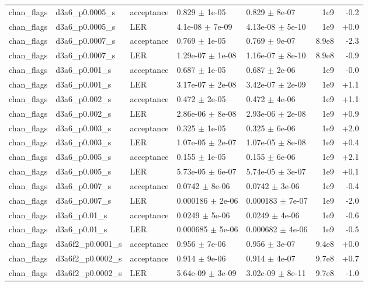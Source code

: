 \documentclass[10pt]{article}
\begin{document}
{\begin{longtable}{l l l l l r r}
chan\_flags & d3a6\_p0.0005\_s & acceptance & 0.829 $\pm$ 1e-05 & 0.829 $\pm$ 8e-07 & 1e9 & -0.2 \\
chan\_flags & d3a6\_p0.0005\_s & LER & 4.1e-08 $\pm$ 7e-09 & 4.13e-08 $\pm$ 5e-10 & 1e9 & +0.0 \\
chan\_flags & d3a6\_p0.0007\_s & acceptance & 0.769 $\pm$ 1e-05 & 0.769 $\pm$ 9e-07 & 8.9e8 & -2.3 \\
chan\_flags & d3a6\_p0.0007\_s & LER & 1.29e-07 $\pm$ 1e-08 & 1.16e-07 $\pm$ 8e-10 & 8.9e8 & -0.9 \\
chan\_flags & d3a6\_p0.001\_s & acceptance & 0.687 $\pm$ 1e-05 & 0.687 $\pm$ 2e-06 & 1e9 & -0.0 \\
chan\_flags & d3a6\_p0.001\_s & LER & 3.17e-07 $\pm$ 2e-08 & 3.42e-07 $\pm$ 2e-09 & 1e9 & +1.1 \\
chan\_flags & d3a6\_p0.002\_s & acceptance & 0.472 $\pm$ 2e-05 & 0.472 $\pm$ 4e-06 & 1e9 & +1.1 \\
chan\_flags & d3a6\_p0.002\_s & LER & 2.86e-06 $\pm$ 8e-08 & 2.93e-06 $\pm$ 2e-08 & 1e9 & +0.9 \\
chan\_flags & d3a6\_p0.003\_s & acceptance & 0.325 $\pm$ 1e-05 & 0.325 $\pm$ 6e-06 & 1e9 & +2.0 \\
chan\_flags & d3a6\_p0.003\_s & LER & 1.07e-05 $\pm$ 2e-07 & 1.07e-05 $\pm$ 8e-08 & 1e9 & +0.4 \\
chan\_flags & d3a6\_p0.005\_s & acceptance & 0.155 $\pm$ 1e-05 & 0.155 $\pm$ 6e-06 & 1e9 & +2.1 \\
chan\_flags & d3a6\_p0.005\_s & LER & 5.73e-05 $\pm$ 6e-07 & 5.74e-05 $\pm$ 3e-07 & 1e9 & +0.1 \\
chan\_flags & d3a6\_p0.007\_s & acceptance & 0.0742 $\pm$ 8e-06 & 0.0742 $\pm$ 3e-06 & 1e9 & -0.4 \\
chan\_flags & d3a6\_p0.007\_s & LER & 0.000186 $\pm$ 2e-06 & 0.000183 $\pm$ 7e-07 & 1e9 & -2.0 \\
chan\_flags & d3a6\_p0.01\_s & acceptance & 0.0249 $\pm$ 5e-06 & 0.0249 $\pm$ 4e-06 & 1e9 & -0.6 \\
chan\_flags & d3a6\_p0.01\_s & LER & 0.000685 $\pm$ 5e-06 & 0.000682 $\pm$ 4e-06 & 1e9 & -0.5 \\
chan\_flags & d3a6f2\_p0.0001\_s & acceptance & 0.956 $\pm$ 7e-06 & 0.956 $\pm$ 3e-07 & 9.4e8 & +0.0 \\
chan\_flags & d3a6f2\_p0.0002\_s & acceptance & 0.914 $\pm$ 9e-06 & 0.914 $\pm$ 4e-07 & 9.7e8 & +0.7 \\
chan\_flags & d3a6f2\_p0.0002\_s & LER & 5.64e-09 $\pm$ 3e-09 & 3.02e-09 $\pm$ 8e-11 & 9.7e8 & -1.0 \\

\end{longtable}}
\end{document}
